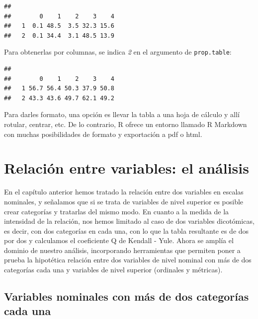 \documentclass[]{book}
\newenvironment{Shaded}{\begin{snugshade}}{\end{snugshade}}
\newcommand{\DecValTok}[1]{\textcolor[rgb]{0.00,0.00,0.81}{#1}}
\newcommand{\FloatTok}[1]{\textcolor[rgb]{0.00,0.00,0.81}{#1}}
\newcommand{\KeywordTok}[1]{\textcolor[rgb]{0.13,0.29,0.53}{\textbf{#1}}}
\newcommand{\NormalTok}[1]{#1}
\newcommand{\OperatorTok}[1]{\textcolor[rgb]{0.81,0.36,0.00}{\textbf{#1}}}
\newcommand{\StringTok}[1]{\textcolor[rgb]{0.31,0.60,0.02}{#1}}
\begin{document}
\begin{verbatim}
##    
##        0    1    2    3    4
##   1  0.1 48.5  3.5 32.3 15.6
##   2  0.1 34.4  3.1 48.5 13.9
\end{verbatim}

Para obtenerlas por columnas, se indica \emph{2} en el argumento de \texttt{prop.table}:

\begin{Shaded}
\end{Shaded}

\begin{verbatim}
##    
##        0    1    2    3    4
##   1 56.7 56.4 50.3 37.9 50.8
##   2 43.3 43.6 49.7 62.1 49.2
\end{verbatim}

Para darles formato, una opción es llevar la tabla a una hoja de cálculo y allí rotular, centrar, etc. De lo contrario, R ofrece un entorno llamado R Markdown con muchas posibilidades de formato y exportación a pdf o html.

\hypertarget{relaciuxf3n-entre-variables-el-anuxe1lisis}{%
\chapter{Relación entre variables: el análisis}\label{relaciuxf3n-entre-variables-el-anuxe1lisis}}

En el capítulo anterior hemos tratado la relación entre dos variables en
escalas nominales, y señalamos que si se trata de variables de nivel
superior es posible crear categorías y tratarlas del mismo modo. En
cuanto a la medida de la intensidad de la relación, nos hemos limitado
al caso de dos variables dicotómicas, es decir, con dos categorías en
cada una, con lo que la tabla resultante es de dos por dos y calculamos
el coeficiente Q de Kendall - Yule. Ahora se amplía el dominio de
nuestro análisis, incorporando herramientas que permiten poner a prueba
la hipotética relación entre dos variables de nivel nominal con más de
dos categorías cada una y variables de nivel superior (ordinales y
métricas).

\hypertarget{variables-nominales-con-muxe1s-de-dos-categoruxedas-cada-una}{%
\section{Variables nominales con más de dos categorías cada una}\label{variables-nominales-con-muxe1s-de-dos-categoruxedas-cada-una}}
\end{document}
